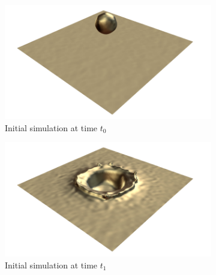 \begin{figure}[!h]
	\centering
	\begin{subfigure}[b]{0.40\linewidth}
		\centering
		\includegraphics[width=\textwidth]{images/fluidsculpting-mig2016/teaser/fluid_004.png}
		\caption{\label{fig:result_detail:drop_0}\footnotesize{Initial simulation at time $t_0$}}
	\end{subfigure}
	\hspace{0.1cm}
	\begin{subfigure}[b]{0.40\linewidth}
		\includegraphics[width=\textwidth]{images/fluidsculpting-mig2016/teaser/fluid_012.png}
		\caption{\label{fig:result_detail:drop_1}\footnotesize{Initial simulation at time $t_1$}}
	\end{subfigure}
	\hspace{0.1cm}
	\begin{subfigure}[b]{0.40\linewidth}

\end{subfigure}
\end{figure}
